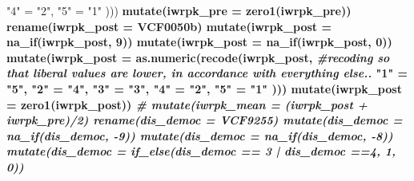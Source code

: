 \documentclass[
]{article}
\newenvironment{Shaded}{\begin{snugshade}}{\end{snugshade}}
\newcommand{\CommentTok}[1]{\textcolor[rgb]{0.56,0.35,0.01}{\textit{#1}}}
\newcommand{\DataTypeTok}[1]{\textcolor[rgb]{0.13,0.29,0.53}{#1}}
\newcommand{\DecValTok}[1]{\textcolor[rgb]{0.00,0.00,0.81}{#1}}
\newcommand{\KeywordTok}[1]{\textcolor[rgb]{0.13,0.29,0.53}{\textbf{#1}}}
\newcommand{\NormalTok}[1]{#1}
\newcommand{\OperatorTok}[1]{\textcolor[rgb]{0.81,0.36,0.00}{\textbf{#1}}}
\newcommand{\StringTok}[1]{\textcolor[rgb]{0.31,0.60,0.02}{#1}}
\begin{document}
\begin{Shaded}
\begin{Highlighting}[]
{{{{{{{{{{{{{{{{{{{{{{{{{{{{{{{{{{{{{{{{{{{{{{{{{{{{{{{{{{{{{{{{{                                                                            \StringTok{"4"}\NormalTok{ =}\StringTok{ "2"}\NormalTok{,}
                                                                            \StringTok{"5"}\NormalTok{ =}\StringTok{ "1"}
\NormalTok{    )))}\OperatorTok{%>%}
\StringTok{    }\KeywordTok{mutate}\NormalTok{(}\DataTypeTok{iwrpk_pre =} \KeywordTok{zero1}\NormalTok{(iwrpk_pre))}\OperatorTok{%>%}
\StringTok{    }\KeywordTok{rename}\NormalTok{(}\DataTypeTok{iwrpk_post =}\NormalTok{ VCF0050b)}\OperatorTok{%>%}
\StringTok{    }\KeywordTok{mutate}\NormalTok{(}\DataTypeTok{iwrpk_post =} \KeywordTok{na_if}\NormalTok{(iwrpk_post, }\DecValTok{9}\NormalTok{))}\OperatorTok{%>%}
\StringTok{    }\KeywordTok{mutate}\NormalTok{(}\DataTypeTok{iwrpk_post =} \KeywordTok{na_if}\NormalTok{(iwrpk_post, }\DecValTok{0}\NormalTok{))}\OperatorTok{%>%}
\StringTok{    }\KeywordTok{mutate}\NormalTok{(}\DataTypeTok{iwrpk_post =} \KeywordTok{as.numeric}\NormalTok{(}\KeywordTok{recode}\NormalTok{(iwrpk_post, }\CommentTok{#recoding so that liberal values are lower, in accordance with everything else..}
                                                                             \StringTok{"1"}\NormalTok{ =}\StringTok{ "5"}\NormalTok{,}
                                                                             \StringTok{"2"}\NormalTok{ =}\StringTok{ "4"}\NormalTok{,}
                                                                             \StringTok{"3"}\NormalTok{ =}\StringTok{ "3"}\NormalTok{,}
                                                                             \StringTok{"4"}\NormalTok{ =}\StringTok{ "2"}\NormalTok{,}
                                                                             \StringTok{"5"}\NormalTok{ =}\StringTok{ "1"}
\NormalTok{    )))}\OperatorTok{%>%}
\StringTok{    }\KeywordTok{mutate}\NormalTok{(}\DataTypeTok{iwrpk_post =} \KeywordTok{zero1}\NormalTok{(iwrpk_post))}\OperatorTok{%>%}
\CommentTok{#   mutate(iwrpk_mean = (iwrpk_post + iwrpk_pre)/2)%>%}
\StringTok{    }\KeywordTok{rename}\NormalTok{(}\DataTypeTok{dis_democ =}\NormalTok{ VCF9255)}\OperatorTok{%>%}
\StringTok{    }\KeywordTok{mutate}\NormalTok{(}\DataTypeTok{dis_democ =} \KeywordTok{na_if}\NormalTok{(dis_democ, }\DecValTok{-9}\NormalTok{))}\OperatorTok{%>%}
\StringTok{    }\KeywordTok{mutate}\NormalTok{(}\DataTypeTok{dis_democ =} \KeywordTok{na_if}\NormalTok{(dis_democ, }\DecValTok{-8}\NormalTok{))}\OperatorTok{%>%}
\StringTok{    }\KeywordTok{mutate}\NormalTok{(}\DataTypeTok{dis_democ =} \KeywordTok{if_else}\NormalTok{(dis_democ }\OperatorTok{==}\StringTok{ }\DecValTok{3} \OperatorTok{|}\StringTok{ }\NormalTok{dis_democ }\OperatorTok{==}\DecValTok{4}\NormalTok{, }\DecValTok{1}\NormalTok{, }\DecValTok{0}\NormalTok{))}\OperatorTok{%>%}
}}}}}}}}}}}}}}}}}}}}}}}}}}}}}}}}}}}}}}}}}}}}}}}}}}}}}}}}}}}}}}}}}}}}}}}}}}}}}
\end{Highlighting}
\end{Shaded}
\end{document}

